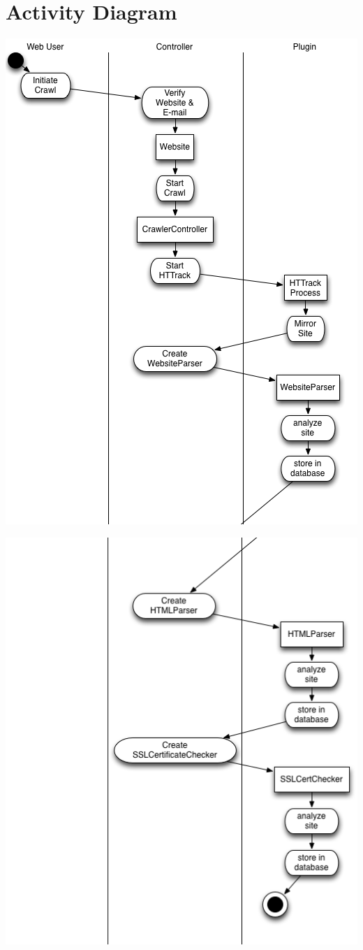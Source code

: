 \documentclass{article}
\begin{document}
\newpage
\section{Activity Diagram}
\includegraphics[width=.8\textwidth, scale=1]{activity1}

\includegraphics[width=.8\textwidth, scale=1]{activity2}
\end{document}
